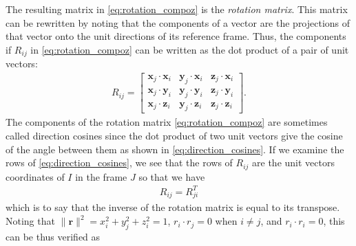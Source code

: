 %
The resulting matrix in \eqref{eq:rotation_compoz} is the \textit{rotation matrix}. This matrix can be rewritten by noting that the components of a vector are the projections of that vector onto the unit directions of its reference frame. Thus, the components if $R_{ij}$ in \eqref{eq:rotation_compoz} can be written as the dot product of a pair of unit vectors:
%
\begin{align}
R_{ij} = \begin{bmatrix}
\bm{x}_j \cdot \bm{x}_i & \bm{y}_j \cdot \bm{x}_i & \bm{z}_j \cdot \bm{x}_i \\
%
\bm{x}_j \cdot \bm{y}_i & \bm{y}_j \cdot \bm{y}_i & \bm{z}_j \cdot \bm{y}_i \\
%
\bm{x}_j \cdot \bm{z}_i & \bm{y}_j \cdot \bm{z}_i & \bm{z}_j \cdot \bm{z}_i 
\end{bmatrix}.
\label{eq:direction_cosines}
\end{align}
%
The components of the rotation matrix \eqref{eq:rotation_compoz} are sometimes called direction cosines since the dot product of two unit  vectors give the cosine of the angle between them as shown in \eqref{eq:direction_cosines}. If we examine the rows of \eqref{eq:direction_cosines}, we see that the rows of $R_{ij}$ are the unit vectors coordinates of $I$  in the frame $J$ so that we have 
%
\begin{align}
R_{ij} = R_{ji}^T
\end{align}
%
which is to say that the inverse of the rotation matrix is equal to its transpose. 
Noting that $\|\bm{r}\|^2 = x_i^2 + y_j^2+z_i^2 = 1$,  $r_i \cdot r_j = 0$ when $i \neq j$, and $r_i \cdot r_i = 0$, this can be thus verified as 
%
